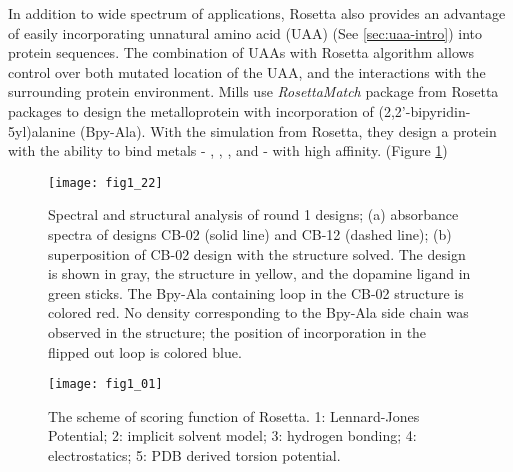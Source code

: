 \begin{refsection}
In addition to wide spectrum of applications, Rosetta also provides an
advantage of easily incorporating unnatural amino acid (UAA) (See
\ref{sec:uaa-intro}) into protein sequences. The combination of UAAs with
Rosetta algorithm allows control over both mutated location of the UAA, and the
interactions with the surrounding protein environment\cite{Renfrew2012b}. Mills
 use \emph{RosettaMatch} package from Rosetta packages to design
the metalloprotein with incorporation of (2,2’-bipyridin-5yl)alanine
(Bpy-Ala)\cite{Mills2013}. With the simulation from Rosetta, they design a
protein with the ability to bind metals - , ,
, and  - with high affinity. (Figure \ref{fig:rosetta-uaa})
\begin{figure}[h!] \centering \texttt{[image: fig1\_22]}
    \caption[Spectral and structural analysis of round 1 designs; (a)
        absorbance spectra of designs CB-02 (solid line) and CB-12 (dashed
        line); (b) superposition of CB-02 design with the structure solved. The
        design is shown in gray, the structure in yellow, and the dopamine
        ligand in green sticks. The Bpy-Ala containing loop in the CB-02
        structure is colored red. No density corresponding to the Bpy-Ala side
        chain was observed in the structure; the position of incorporation in
    the flipped out loop is colored blue.] {Spectral and structural analysis of
        round 1 designs; (a) absorbance spectra of designs CB-02 (solid line)
        and CB-12 (dashed line); (b) superposition of CB-02 design with the
        structure solved. The design is shown in gray, the structure in yellow,
        and the dopamine ligand in green sticks. The Bpy-Ala containing loop in
        the CB-02 structure is colored red. No density corresponding to the
        Bpy-Ala side chain was observed in the structure; the position of
        incorporation in the flipped out loop is colored blue\cite{Mills2013}.}
        \label{fig:rosetta-uaa} 
\end{figure}
\begin{figure}[h!] \centering \texttt{[image: fig1\_01]}
    \caption[The scheme of scoring function of Rosetta. 1: Lennard-Jones
    Potential; 2: implicit solvent model; 3: hydrogen bonding; 4:
electrostatics; 5: PDB drived torsion potential.]{The scheme of scoring
    function of Rosetta. 1: Lennard-Jones Potential; 2: implicit solvent model;
3: hydrogen bonding; 4: electrostatics; 5: PDB derived torsion potential.}
\label{fig:rosetta-intro}
\end{figure}


\end{refsection}
